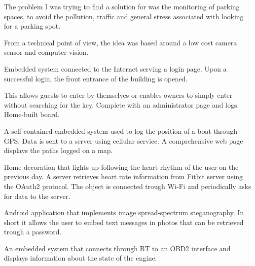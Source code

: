 \documentclass[11 pt,oneside,a4paper,titlepage]{article}
\begin{document}
{\begin{minipage}{11.3cm}
{        The problem I was trying to find a solution for was the monitoring 
        of parking spaces, to avoid the pollution, traffic and general stress 
        associated with looking for a parking spot. 
        
        From a technical point of view, the idea was based around a 
        low cost camera sensor and computer vision.
    }
    
    \vspace*{0.22cm}
    {
        Embedded system connected to the Internet serving a login page. 
        Upon a successful login, the front entrance of the building is opened. 
        
        This allows guests to enter by themselves or enables owners to simply 
        enter without searching  for the key. Complete with an administrator page and logs. 
        Home-built board.
    }

    \vspace*{0.22cm}
    {
        A self-contained embedded system used to log the position of a boat through GPS. 
        Data is sent to a server using cellular service. 
        A comprehensive web page displays the paths logged on a map.
    }

    \vspace*{0.22cm}
    {
        Home decoration that lights up following the heart rhythm of the user on the previous day. 
        A server retrieves heart rate information from Fitbit server using the OAuth2 protocol. 
        The object is connected trough Wi-Fi and periodically asks for data to the server.
    }	

    \vspace*{0.22cm}
    {
        Android application that implements image spread-spectrum steganography. 
        In short it allows the user to embed text messages in photos 
        that can be retrieved trough a password.
    }

    \vspace*{0.22cm}
    {
        An embedded system that connects through BT to an OBD2 interface and displays information about the state of the engine.
    }	
    
    

\end{minipage}}
\end{document}
